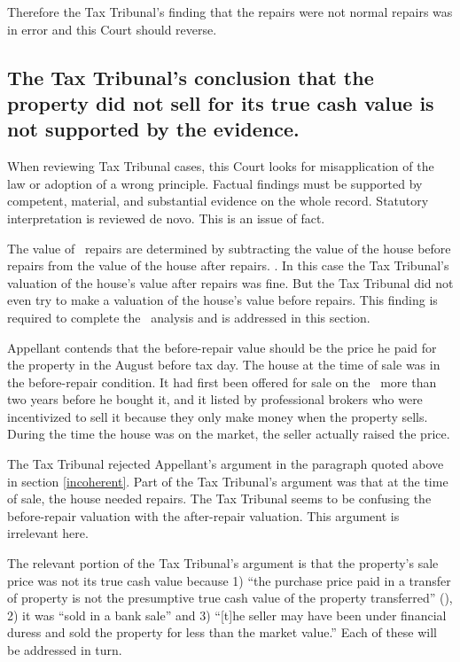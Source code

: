 \documentclass[12pt,\documentclassflag]{michiganCourtOfAppealsBrief}
\def\mathieuGast{\pincite[l]{MCL}{211.27(2)}}
\begin{document}
Therefore the Tax Tribunal's finding that the repairs were not normal repairs was in error and this Court should reverse.

\subsection{The Tax Tribunal's conclusion that the property did not sell for its true cash value is not supported by the evidence.}

When reviewing Tax Tribunal cases, this Court looks for misapplication of the law or adoption of a wrong principle. Factual findings must be supported by competent, material, and substantial evidence on the whole record. Statutory interpretation is reviewed de novo.  This is an issue of fact. 

The value of \mathieuGast\ repairs are determined by subtracting the value of the house before repairs from the value of the house after repairs. . In this case the Tax Tribunal's valuation of the house's value after repairs was fine. But the Tax Tribunal did not even try to make a valuation of the house's value before repairs. This finding is required to complete the \mathieuGast\ analysis and is addressed in this section.

Appellant contends that the before-repair value should be the price he paid for the property in the August before tax day. The house at the time of sale was in the before-repair condition. It had first been offered for sale on the \MLS\ more than two years before he bought it, and it listed by professional brokers who were incentivized to sell it because they only make money when the property sells. During the time the house was on the market, the seller actually raised the price.

The Tax Tribunal rejected Appellant's argument in the paragraph quoted above in section \ref{incoherent}. Part of the Tax Tribunal's argument was that at the time of sale, the house needed repairs. The Tax Tribunal seems to be confusing the before-repair valuation with the after-repair valuation. This argument is irrelevant here.

The relevant portion of the Tax Tribunal's argument is that the property's sale price was not its true cash value because 1) ``the purchase price paid in a transfer of property is not the presumptive true cash value of the property transferred'' (), 2)  it was ``sold in a bank sale'' and 3) ``[t]he seller may have been under financial duress and sold the property for less than the market value.'' Each of these will be addressed in turn.
\end{document}
